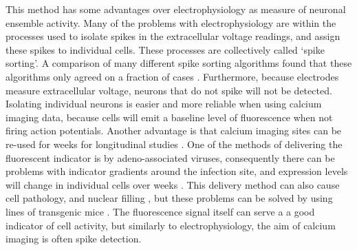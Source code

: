 This method has some advantages over electrophysiology as measure of neuronal ensemble activity. Many of the problems with electrophysiology are within the processes used to isolate spikes in the extracellular voltage readings, and assign these spikes to individual cells. These processes are collectively called `spike sorting'. A comparison of many different spike sorting algorithms found that these algorithms only agreed on a fraction of cases \parencite{buccino}. Furthermore, because electrodes measure extracellular voltage, neurons that do not spike will not be detected. Isolating individual neurons is easier and more reliable when using calcium imaging data, because cells will emit a baseline level of fluorescence when not firing action potentials. Another advantage is that calcium imaging sites can be re-used for weeks for longitudinal studies \parencite{chen}. One of the methods of delivering the fluorescent indicator is by adeno-associated viruses, consequently there can be problems with indicator gradients around the infection site, and expression levels will change in individual cells over weeks \parencite{tian, chen}. This delivery method can also cause cell pathology, and nuclear filling \parencite{zariwala}, but these problems can be solved by using lines of transgenic mice \parencite{dana}. The fluorescence signal itself can serve a a good indicator of cell activity, but similarly to electrophysiology, the aim of calcium imaging is often spike detection.

